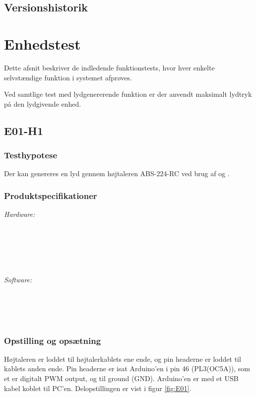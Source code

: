 	
		
		\subsection{Versionshistorik}

 
\section{Enhedstest}
	Dette afsnit beskriver de indledende funktionstests, hvor hver enkelte selvstændige funktion i systemet afprøves. 
	
	Ved samtlige test med lydgenererende funktion er der anvendt maksimalt lydtryk på den lydgivende enhed.
	
	\subsection{E01-H1}
	\label{subsec:E01}
		\subsubsection{Testhypotese}
		Der kan genereres en lyd gennem højtaleren ABS-224-RC ved brug af \arduino{} og \labview.		
		\subsubsection{Produktspecifikationer}
	
	
		\textit{Hardware:}\\
		\\
		\hojtalerkabel\\
		\pins\\
		\arduino\\
		\PC\\
		\usbkabel
	
		\textit{Software:}\\
		\labview\\
		\visa\\
		\vi\\
		\ardsw\
	
		\subsubsection{Opstilling og opsætning}
		Højtaleren er loddet til højtalerkablets ene ende, og pin headerne er loddet til kablets anden ende. 
		Pin headerne er isat Arduino'en i pin 46 (PL3(OC5A)), som et er digitalt PWM output, og til ground (GND). 
		Arduino'en er med et USB kabel koblet til PC'en. Delopstillingen er vist i figur \ref{fig:E01}.\\ 
	  
